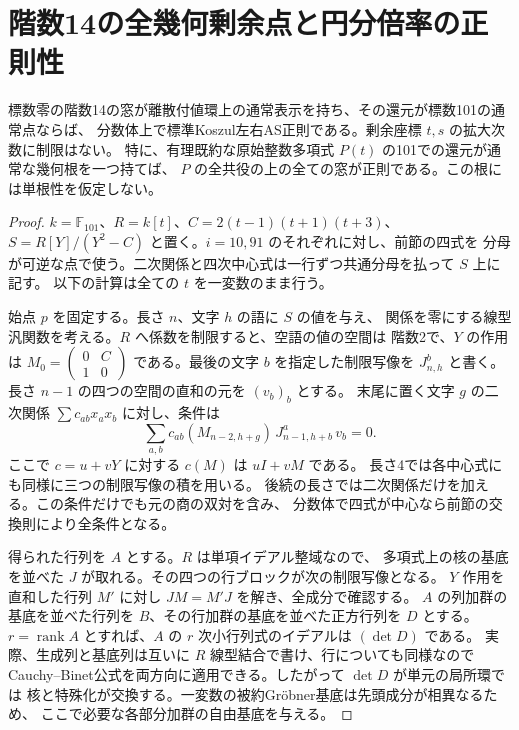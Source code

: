 \section{階数14の全幾何剰余点と円分倍率の正則性}
\label{sec:rank-fourteen-geometric-reduction}
\begin{theorem}\label{thm:rank-fourteen-geometric-reduction}
標数零の階数14の窓が離散付値環上の通常表示を持ち、その還元が標数101の通常点ならば、
分数体上で標準Koszul左右AS正則である。剰余座標 $t,s$ の拡大次数に制限はない。
特に、有理既約な原始整数多項式 $P(t)$ の101での還元が通常な幾何根を一つ持てば、
$P$ の全共役の上の全ての窓が正則である。この根には単根性を仮定しない。
\end{theorem}
\begin{proof}
$k=\mathbb F_{101}$、$R=k[t]$、$C=2(t-1)(t+1)(t+3)$、
$S=R[Y]/(Y^2-C)$ と置く。$i=10,91$ のそれぞれに対し、前節の四式を
分母が可逆な点で使う。二次関係と四次中心式は一行ずつ共通分母を払って $S$ 上に記す。
以下の計算は全ての $t$ を一変数のまま行う。

始点 $p$ を固定する。長さ $n$、文字 $h$ の語に $S$ の値を与え、
関係を零にする線型汎関数を考える。$R$ へ係数を制限すると、空語の値の空間は
階数2で、$Y$ の作用は $M_0=\left(\begin{smallmatrix}0&C\\1&0\end{smallmatrix}\right)$
である。最後の文字 $b$ を指定した制限写像を $J_{n,h}^{b}$ と書く。
長さ $n-1$ の四つの空間の直和の元を $(v_b)_b$ とする。
末尾に置く文字 $g$ の二次関係 $\sum c_{ab}x_ax_b$ に対し、条件は
\[
 \sum_{a,b} c_{ab}(M_{n-2,h+g})\,J_{n-1,h+b}^{a}\,v_b=0 .
\]
ここで $c=u+vY$ に対する $c(M)$ は $uI+vM$ である。
長さ4では各中心式にも同様に三つの制限写像の積を用いる。
後続の長さでは二次関係だけを加える。この条件だけでも元の商の双対を含み、
分数体で四式が中心なら前節の交換則により全条件となる。

得られた行列を $A$ とする。$R$ は単項イデアル整域なので、
多項式上の核の基底を並べた $J$ が取れる。その四つの行ブロックが次の制限写像となる。
$Y$ 作用を直和した行列 $M'$ に対し $JM=M'J$ を解き、全成分で確認する。
$A$ の列加群の基底を並べた行列を $B$、その行加群の基底を並べた正方行列を $D$ とする。
$r=\operatorname{rank}A$ とすれば、$A$ の $r$ 次小行列式のイデアルは $(\det D)$ である。
実際、生成列と基底列は互いに $R$ 線型結合で書け、行についても同様なので
Cauchy--Binet公式を両方向に適用できる。したがって $\det D$ が単元の局所環では
核と特殊化が交換する。一変数の被約Gröbner基底は先頭成分が相異なるため、
ここで必要な各部分加群の自由基底を与える。


\end{proof}
